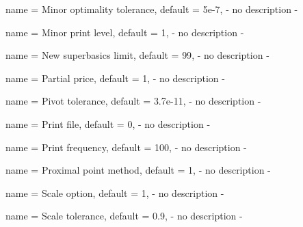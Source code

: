 \begin{parameter}{
    name    = {Minor optimality tolerance},
    default = {5e-7},
}
- no description -
\end{parameter}

\begin{parameter}{
    name    = {Minor print level},
    default = {1},
}
- no description -
\end{parameter}

\begin{parameter}{
    name    = {New superbasics limit},
    default = {99},
}
- no description -
\end{parameter}

\begin{parameter}{
    name    = {Partial price},
    default = {1},
}
- no description -
\end{parameter}

\begin{parameter}{
    name    = {Pivot tolerance},
    default = {3.7e-11},
}
- no description -
\end{parameter}

\begin{parameter}{
    name    = {Print file},
    default = {0},
}
- no description -
\end{parameter}

\begin{parameter}{
    name    = {Print frequency},
    default = {100},
}
- no description -
\end{parameter}

\begin{parameter}{
    name    = {Proximal point method},
    default = {1},
}
- no description -
\end{parameter}

\begin{parameter}{
    name    = {Scale option},
    default = {1},
}
- no description -
\end{parameter}

\begin{parameter}{
    name    = {Scale tolerance},
    default = {0.9},
}
- no description -
\end{parameter}

